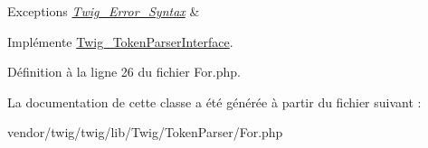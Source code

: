 \begin{DoxyExceptions}{Exceptions}
{\em \hyperlink{class_twig___error___syntax}{Twig\+\_\+\+Error\+\_\+\+Syntax}} & \\
\hline
\end{DoxyExceptions}


Implémente \hyperlink{interface_twig___token_parser_interface_a5dfa2e269321584fb74e8b43dabe0efd}{Twig\+\_\+\+Token\+Parser\+Interface}.



Définition à la ligne 26 du fichier For.\+php.



La documentation de cette classe a été générée à partir du fichier suivant \+:\begin{DoxyCompactItemize}
\item 
vendor/twig/twig/lib/\+Twig/\+Token\+Parser/For.\+php\end{DoxyCompactItemize}
